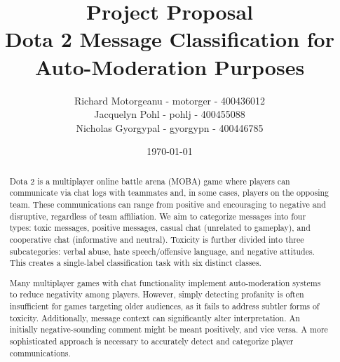 \documentclass[11pt, letterpaper, notitlepage]{article}
\title{Project Proposal \\ Dota 2 Message Classification for Auto-Moderation Purposes}
\author{Richard Motorgeanu - motorger - 400436012\\ Jacquelyn Pohl - pohlj - 400455088\\ Nicholas Gyorgypal - gyorgypn - 400446785}
\date{\today}
\begin{document}
\maketitle

\vspace{4em}

\begin{abstract}



    Dota 2 is a multiplayer online battle arena (MOBA) game where players can communicate via chat logs with teammates and, in some cases, players on the opposing team. These communications can range from positive and encouraging to negative and disruptive, regardless of team affiliation. We aim to categorize messages into four types: toxic messages, positive messages, casual chat (unrelated to gameplay), and cooperative chat (informative and neutral). Toxicity is further divided into three subcategories: verbal abuse, hate speech/offensive language, and negative attitudes. This creates a single-label classification task with six distinct classes.

    Many multiplayer games with chat functionality implement auto-moderation systems to reduce negativity among players. However, simply detecting profanity is often insufficient for games targeting older audiences, as it fails to address subtler forms of toxicity. Additionally, message context can significantly alter interpretation. An initially negative-sounding comment might be meant positively, and vice versa. A more sophisticated approach is necessary to accurately detect and categorize player communications.

\end{abstract}
\end{document}
